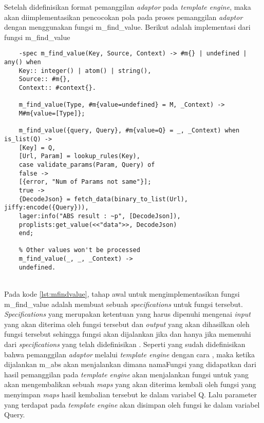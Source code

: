 Setelah didefinisikan format pemanggilan \textit{adaptor} pada \textit{template engine}, maka akan diimplementasikan pencocokan pola pada proses pemanggilan \textit{adaptor} dengan menggunakan fungsi m\_find\_value. Berikut adalah implementasi dari fungsi m\_find\_value

\begin{minipage}{\linewidth}
	\begin{lstlisting}[caption={Implementasi fungsi m\_find\_value},label={lst:mfindvalue}]
	% this method to handle call api from template
	-spec m_find_value(Key, Source, Context) -> #m{} | undefined | any() when
	Key:: integer() | atom() | string(),
	Source:: #m{},
	Context:: #context{}.
	
	m_find_value(Type, #m{value=undefined} = M, _Context) ->
	M#m{value=[Type]};
	
	m_find_value({query, Query}, #m{value=Q} = _, _Context) when is_list(Q) ->
	[Key] = Q,
	[Url, Param] = lookup_rules(Key),
	case validate_params(Param, Query) of
	false ->
	[{error, "Num of Params not same"}];
	true ->
	{DecodeJson} = fetch_data(binary_to_list(Url), jiffy:encode({Query})),
	lager:info("ABS result : ~p", [DecodeJson]),
	proplists:get_value(<<"data">>, DecodeJson)
	end;
	
	% Other values won't be processed
	m_find_value(_, _, _Context) ->
	undefined. 
	\end{lstlisting}
\end{minipage}\\

Pada kode \ref{lst:mfindvalue}, tahap awal untuk mengimplementasikan fungsi m\_find\_value adalah membuat sebuah \textit{specifications} untuk fungsi tersebut. \textit{Specifications} yang merupakan ketentuan yang harus dipenuhi mengenai \textit{input} yang akan diterima oleh fungsi tersebut dan \textit{output} yang akan dihasilkan oleh fungsi tersebut sehingga fungsi akan dijalankan jika dan hanya jika memenuhi dari \textit{specifications} yang telah didefinisikan \cite{article.rebecca}. Seperti yang sudah didefinisikan bahwa pemanggilan \textit{adaptor} melalui \textit{template engine} dengan cara , maka ketika dijalankan m\_abs akan menjalankan  dimana namaFungsi yang didapatkan dari hasil pemanggilan pada \textit{template engine} akan menjalankan fungsi  untuk yang akan mengembalikan sebuah \textit{maps} yang akan diterima kembali oleh fungsi  yang menyimpan \textit{maps} hasil kembalian tersebut ke dalam variabel Q. Lalu parameter yang terdapat pada \textit{template engine} akan disimpan oleh fungsi  ke dalam variabel Query.

